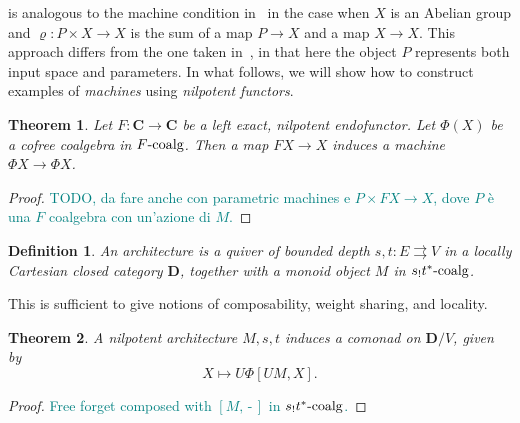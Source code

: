 \documentclass[12pt]{article}
\newtheorem{theorem}{Theorem}
\newtheorem{definition}{Definition}
\newcommand{\pietro}[1]{\textcolor{teal}{#1}}
\newcommand{\Cat}{{\mathbf{C}}}
\newcommand{\DCat}{{\mathbf{D}}}
\newcommand{\FCoalg}{{F\textnormal{-coalg}}}
\newcommand{\stCoalg}{{s_!t^*\textnormal{-coalg}}}
\newcommand{\anon}{{\,\mbox{-}\,}}
\begin{document}
 is analogous to the machine condition in~\cite{2020arXiv200702777V} in the case when $X$ is an Abelian group and $\varrho\colon P \times X \rightarrow X$ is the sum of a map $P \rightarrow X$ and a map $X \rightarrow X$. This approach differs from the one taken in~\cite{2020arXiv200702777V}, in that here the object $P$ represents both input space and parameters. In what follows, we will show how to construct examples of {\em machines} using {\em nilpotent functors}.


\begin{theorem}\label{thm:nilpotent_architecture}
    Let $F\colon \Cat \rightarrow \Cat$ be a left exact, nilpotent endofunctor. Let $\Phi(X)$ be a cofree coalgebra in $\FCoalg$. Then a map $F X \rightarrow X$ induces a machine $\Phi X \rightarrow \Phi X$.
\end{theorem}

\begin{proof}
    \pietro{TODO, da fare anche con parametric machines e $P \times F X \rightarrow X$, dove $P$ è una $F$ coalgebra con un'azione di $M$.}
\end{proof}

\begin{definition}\label{def:architecture}
    An {\em architecture} is a quiver of bounded depth $s,t \colon E \rightrightarrows V$ in a locally Cartesian closed category $\DCat$, together with a monoid object $M$ in $\stCoalg$.
\end{definition}

This is sufficient to give notions of composability, weight sharing, and locality.

\begin{theorem}\label{thm:weight_sharing}
    A nilpotent architecture $M, s, t$ induces a comonad on $\DCat/V$, given by
    \begin{equation*}
        X \mapsto U\Phi[UM, X].
    \end{equation*}
\end{theorem}

\begin{proof}
    \pietro{Free forget composed with $[M, \anon]$ in $\stCoalg$.}
\end{proof}
\end{document}
